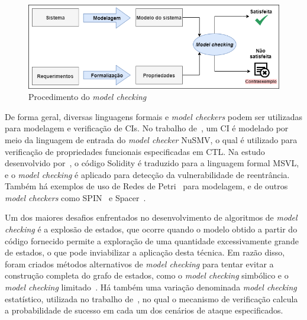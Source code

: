\begin{figure}[!htb]
 \caption{Procedimento do \textit{model checking}}
 \label{fig:model-checking}
 \centering
 \includegraphics[scale=0.6]{figuras/model-checking.png}
\end{figure}

De forma geral, diversas linguagens formais e \textit{model checkers} podem ser utilizadas para modelagem e verificação de CIs. No trabalho de~, um CI é modelado por meio da linguagem de entrada do \textit{model checker} NuSMV, o qual é utilizado para verificação de propriedades funcionais especificadas em CTL. Na estudo desenvolvido por~, o código Solidity é traduzido para a linguagem formal MSVL, e o \textit{model checking} é aplicado para detecção da vulnerabilidade de reentrância. Também há exemplos de uso de Redes de Petri~\cite{liu2019formal-42} para modelagem, e de outros \textit{model checkers} como SPIN~\cite{bai2018formal-41, osterland2020model-58} e Spacer~\cite{marescotti2020accurate-10}.  

Um dos maiores desafios enfrentados no desenvolvimento de algoritmos de \textit{model checking} é a explosão de estados, que ocorre quando o modelo obtido a partir do código fornecido permite a exploração de uma quantidade excessivamente grande de estados, o que pode inviabilizar a aplicação desta técnica. Em razão disso, foram criados métodos alternativos de \textit{model checking} para tentar evitar a construção completa do grafo de estados, como o \textit{model checking} simbólico e o \textit{model checking} limitado~\cite{peled2019formal-methods}. Há também uma variação denominada \textit{model checking} estatístico, utilizada no trabalho de~, no qual o mecanismo de verificação calcula a probabilidade de sucesso em cada um dos cenários de ataque especificados. 


